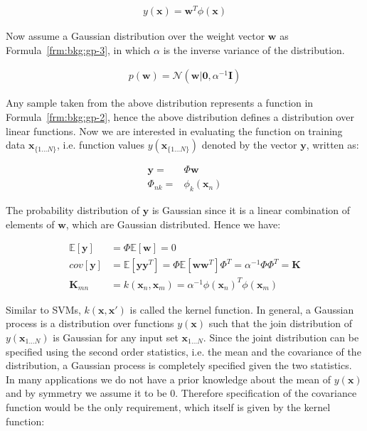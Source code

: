 \begin{align}
  y(\mathbf{x}) = \mathbf{w}^T \phi(\mathbf{x})
  \label{frm:bkg:gp-2}
\end{align}

Now assume a Gaussian distribution over the weight vector $\mathbf{w}$ as Formula~\ref{frm:bkg:gp-3}, in which $\alpha$ is the inverse variance of the distribution.

\begin{align}
  p(\mathbf{w}) = \mathcal{N}(\mathbf{w}|\mathbf{0}, \alpha^{-1}\mathbf{I})
  \label{frm:bkg:gp-3}
\end{align}

Any sample taken from the above distribution represents a function in Formula~\ref{frm:bkg:gp-2}, hence the above distribution defines a distribution over linear functions. Now we are interested in evaluating the function on training data $\mathbf{x}_{\{1\ldots N\}}$, i.e. function values $y(\mathbf{x}_{\{1\ldots N\}})$ denoted by the vector $\mathbf{y}$, written as:

\begin{align}
  \mathbf{y} = &\Phi\mathbf{w} \nonumber \\
  \Phi_{nk} = &\phi_k(\mathbf{x}_n)
  \label{frm:bkg:gp-4}
\end{align}

The probability distribution of $\mathbf{y}$ is Gaussian since it is a linear combination of elements of $\mathbf{w}$, which are Gaussian distributed. Hence we have:

\begin{align}
  \mathbb{E}[\mathbf{y}] & = \Phi\mathbb{E}[\mathbf{w}] = 0 \nonumber \\
  cov[\mathbf{y}] & = \mathbb{E}[\mathbf{yy}^T] = \Phi\mathbb{E}[\mathbf{ww}^T]\Phi^T = \alpha^{-1}\Phi\Phi^T = \mathbf{K} \nonumber \\
  \mathbf{K}_{mn} & = k(\mathbf{x}_n,\mathbf{x}_m) = \alpha^{-1}\phi(\mathbf{x}_n)^T\phi(\mathbf{x}_m)
  \label{frm:bkg:gp-5}
\end{align}

Similar to SVMs, $k(\mathbf{x},\mathbf{x}')$ is called the kernel function. In general, a Gaussian process is a distribution over functions $y(\mathbf{x})$ such that the join distribution of $y(\mathbf{x}_{1\ldots N})$ is Gaussian for any input set $\mathbf{x}_{1\ldots N}$. Since the joint distribution can be specified using the second order statistics, i.e. the mean and the covariance of the distribution, a Gaussian process is completely specified given the two statistics. In many applications we do not have a prior knowledge about the mean of $y(\mathbf{x})$ and by symmetry we assume it to be $0$. Therefore specification of the covariance function would be the only requirement, which itself is given by the kernel function:

